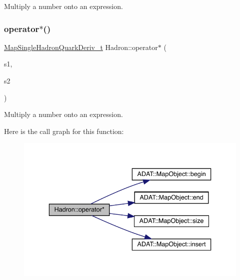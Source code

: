 Multiply a number onto an expression. 

\mbox{\label{namespaceHadron_aee77eafb416d7080a53fa0bd52528d11}} 
\subsubsection{\texorpdfstring{operator$\ast$()}{operator*()}\hspace{0.1cm}{\footnotesize\ttfamily [4/6]}}
{\footnotesize\ttfamily \mbox{\hyperlink{namespaceHadron_aa588220689caea8a6aad4d0296526e6b}{Map\+Single\+Hadron\+Quark\+Deriv\+\_\+t}} Hadron\+::operator$\ast$ (\begin{DoxyParamCaption}\item[{const std\+::complex$<$ double $>$ \&}]{s1,  }\item[{const \mbox{\hyperlink{namespaceHadron_aa588220689caea8a6aad4d0296526e6b}{Map\+Single\+Hadron\+Quark\+Deriv\+\_\+t}} \&}]{s2 }\end{DoxyParamCaption})}



Multiply a number onto an expression. 

Here is the call graph for this function\+:\nopagebreak
\begin{figure}[H]
\begin{center}
\leavevmode
\includegraphics[width=336pt]{d1/daf/namespaceHadron_aee77eafb416d7080a53fa0bd52528d11_cgraph}
\end{center}
\end{figure}
\mbox{\label{namespaceHadron_af8f26e76a642072270a910f3326d758f}} 
